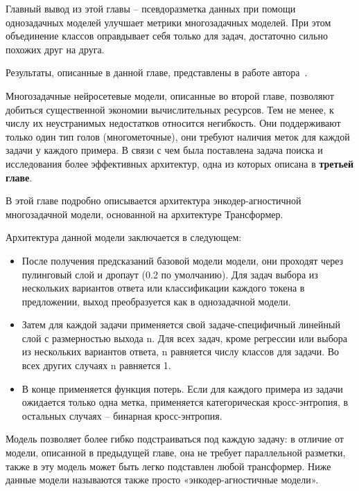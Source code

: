 Главный вывод из этой главы -- псевдоразметка данных при помощи однозадачных моделей улучшает метрики многозадачных моделей. При этом объединение классов оправдывает себя только для задач, достаточно сильно похожих друг на друга. 

Результаты, описанные в данной главе, представлены в работе автора~\cite{pseudolabel}.


Многозадачные нейросетевые модели, описанные во второй главе, позволяют добиться существенной экономии вычислительных ресурсов. Тем не менее, к числу их неустранимых недостатков относится негибкость.
Они поддерживают только один тип голов (многометочные), они требуют наличия меток для каждой задачи у каждого примера. В связи с чем была поставлена задача поиска и исследования более эффективных архитектур, одна из которых описана в \textbf{третьей главе}.

В этой главе  подробно описывается архитектура энкодер-агностичной многозадачной модели, основанной на архитектуре Трансформер.

Архитектура данной модели заключается в следующем:
\begin{itemize}

  \item После получения предсказаний базовой модели модели, они проходят через пулинговый слой и дропаут (0.2 по умолчанию). Для задач выбора из нескольких вариантов ответа или классификации каждого токена в предложении, выход преобразуется как в однозадачной модели.

  \item Затем для каждой задачи применяется свой задаче-специфичный линейный слой с размерностью выхода {n}. Для всех задач, кроме регрессии или выбора из нескольких вариантов ответа, {n} равняется числу классов для задачи. Во всех других случаях {n} равняется 1.
 
  \item В конце применяется функция потерь. Если для каждого примера из задачи ожидается только одна метка, применяется категорическая кросс-энтропия, в остальных случаях -- бинарная кросс-энтропия. 

\end{itemize}

Модель позволяет более гибко подстраиваться под каждую задачу: в отличие от модели, описанной в предыдущей главе, она не требует параллельной разметки, также в эту модель может быть легко подставлен любой трансформер. Ниже данные модели называются также просто «энкодер-агностичные модели».


